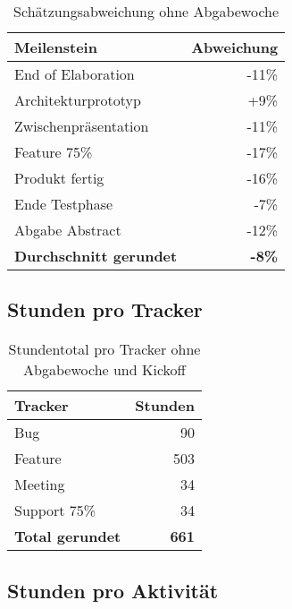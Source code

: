 \begin{table}[H]
\begin{center}
\begin{tabularx}{7.4cm}{ l | r }
\textbf{Meilenstein} & \textbf{Abweichung} \\ \hline
End of Elaboration   & -11\% \\ \hline
Architekturprototyp  & +9\% \\ \hline
Zwischenpräsentation & -11\% \\ \hline
Feature 75\%         & -17\%  \\ \hline
Produkt fertig       & -16\%  \\ \hline
Ende Testphase       & -7\%  \\ \hline
Abgabe Abstract      & -12\%  \\ \hline
\textbf{Durchschnitt gerundet} & \textbf{-8\%}  \\ \hline
\end{tabularx}
\caption{Schätzungsabweichung ohne Abgabewoche}
\label{table:accuracy}
\end{center}
\end{table}

\subsection{Stunden pro Tracker}
\label{sec:pertracker}

\begin{table}[H]
\begin{center}
\begin{tabularx}{5.5cm}{ l | r }
\textbf{Tracker} & \textbf{Stunden} \\ \hline
Bug   & 90 \\ \hline
Feature  & 503 \\ \hline
Meeting & 34 \\ \hline
Support 75\%         & 34  \\ \hline
\textbf{Total gerundet} & \textbf{661}  \\ \hline
\end{tabularx}
\caption{Stundentotal pro Tracker ohne Abgabewoche und Kickoff}
\label{table:tpertracker}
\end{center}
\end{table}

\subsection{Stunden pro Aktivität}
\label{sec:peractivity}

